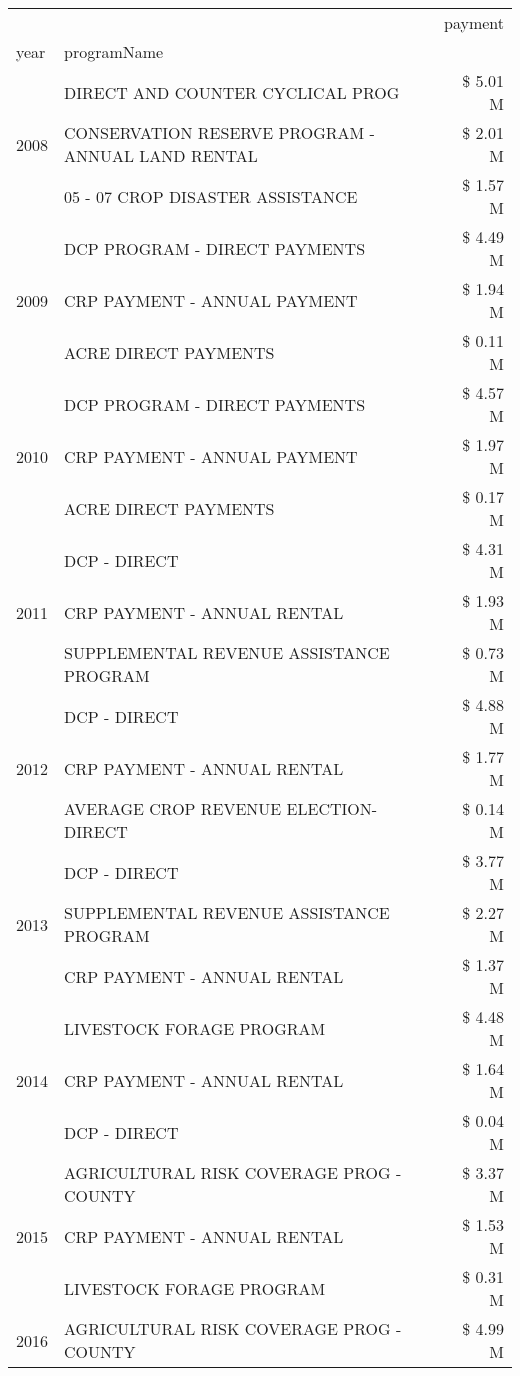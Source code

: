 \begin{tabular}{llr}
\toprule
 &  & payment \\
year & programName &  \\
\midrule
\multirow[t]{3}{*}{2008} & DIRECT AND COUNTER CYCLICAL PROG & \$ 5.01 M \\
 & CONSERVATION RESERVE PROGRAM - ANNUAL LAND RENTAL & \$ 2.01 M \\
 & 05 - 07 CROP DISASTER ASSISTANCE & \$ 1.57 M \\
\cline{1-3}
\multirow[t]{3}{*}{2009} & DCP PROGRAM - DIRECT PAYMENTS & \$ 4.49 M \\
 & CRP PAYMENT - ANNUAL PAYMENT & \$ 1.94 M \\
 & ACRE DIRECT PAYMENTS & \$ 0.11 M \\
\cline{1-3}
\multirow[t]{3}{*}{2010} & DCP PROGRAM - DIRECT PAYMENTS & \$ 4.57 M \\
 & CRP PAYMENT - ANNUAL PAYMENT & \$ 1.97 M \\
 & ACRE DIRECT PAYMENTS & \$ 0.17 M \\
\cline{1-3}
\multirow[t]{3}{*}{2011} & DCP - DIRECT & \$ 4.31 M \\
 & CRP PAYMENT - ANNUAL RENTAL & \$ 1.93 M \\
 & SUPPLEMENTAL REVENUE ASSISTANCE PROGRAM & \$ 0.73 M \\
\cline{1-3}
\multirow[t]{3}{*}{2012} & DCP - DIRECT & \$ 4.88 M \\
 & CRP PAYMENT - ANNUAL RENTAL & \$ 1.77 M \\
 & AVERAGE CROP REVENUE ELECTION-DIRECT & \$ 0.14 M \\
\cline{1-3}
\multirow[t]{3}{*}{2013} & DCP - DIRECT & \$ 3.77 M \\
 & SUPPLEMENTAL REVENUE ASSISTANCE PROGRAM & \$ 2.27 M \\
 & CRP PAYMENT - ANNUAL RENTAL & \$ 1.37 M \\
\cline{1-3}
\multirow[t]{3}{*}{2014} & LIVESTOCK FORAGE PROGRAM & \$ 4.48 M \\
 & CRP PAYMENT - ANNUAL RENTAL & \$ 1.64 M \\
 & DCP - DIRECT & \$ 0.04 M \\
\cline{1-3}
\multirow[t]{3}{*}{2015} & AGRICULTURAL RISK COVERAGE PROG - COUNTY & \$ 3.37 M \\
 & CRP PAYMENT - ANNUAL RENTAL & \$ 1.53 M \\
 & LIVESTOCK FORAGE PROGRAM & \$ 0.31 M \\
\cline{1-3}
\multirow[t]{3}{*}{2016} & AGRICULTURAL RISK COVERAGE PROG - COUNTY & \$ 4.99 M \\

\end{tabular}
